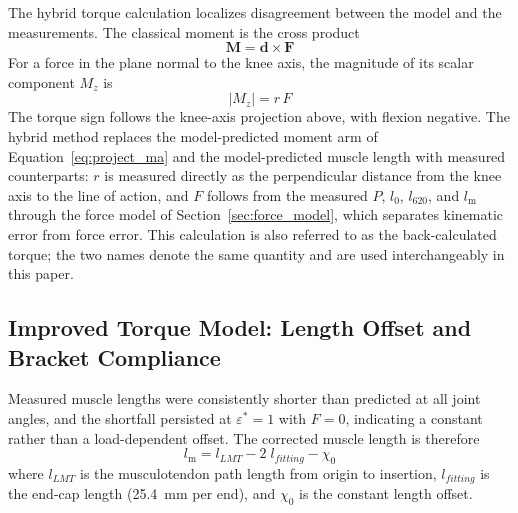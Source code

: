 \documentclass[utf8]{FrontiersinHarvard} %
\begin{document}
The hybrid torque calculation localizes disagreement between the model and the measurements. The classical moment is the cross product
\begin{equation}
    \mathbf{M} = \mathbf{d} \times \mathbf{F} \label{eq:M_vec}
\end{equation}
For a force in the plane normal to the knee axis, the magnitude of its scalar component $M_z$ is
\begin{equation}
    \lvert M_{z}\rvert = r\,F \label{eq:M_scalar}
\end{equation}
The torque sign follows the knee-axis projection above, with flexion negative. The hybrid method replaces the model-predicted moment arm of Equation~\eqref{eq:project_ma} and the model-predicted muscle length with measured counterparts: $r$ is measured directly as the perpendicular distance from the knee axis to the line of action, and $F$ follows from the measured $P$, $l_{0}$, $l_{620}$, and $l_\text{m}$ through the force model of Section~\ref{sec:force_model}, which separates kinematic error from force error. This calculation is also referred to as the back-calculated torque; the two names denote the same quantity and are used interchangeably in this paper.

\subsection{Improved Torque Model: Length Offset and Bracket Compliance}\label{sec:improved_model}

Measured muscle lengths were consistently shorter than predicted at all joint angles, and the shortfall persisted at $\varepsilon^{*} = 1$ with $F = 0$, indicating a constant rather than a load-dependent offset. The corrected muscle length is therefore
\begin{equation}
    l_\text{m} = l_{LMT} - 2\;l_{fitting} - \chi_{0}
    \label{eq:Lm}
\end{equation}
where $l_{LMT}$ is the musculotendon path length from origin to insertion, $l_{fitting}$ is the end-cap length (\qty{25.4}{\mm} per end), and $\chi_{0}$ is the constant length offset.
\end{document}
